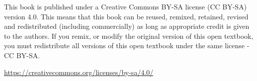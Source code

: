 

\clearpage
\newpage

\vspace*{40pt}


\begin{center}
This book is published under a Creative Commons BY-SA license (CC BY-SA) version 4.0. This means that this book can be reused, remixed, retained, revised and redistributed (including commercially) as long as appropriate credit is given to the authors. If you remix, or modify the original version of this open textbook, you must redistribute all versions of this open textbook under the same license - CC BY-SA.

\vspace*{18pt}

\url{https://creativecommons.org/licenses/by-sa/4.0/}
\end{center}